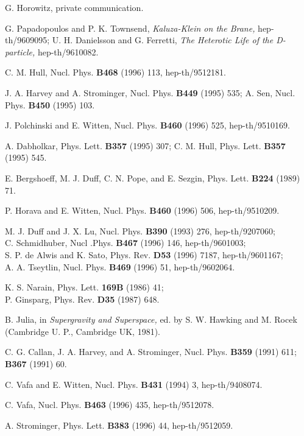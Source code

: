 \documentclass[12pt]{article}
\begin{document}
\begin{thebibliography}{99}
G. Horowitz, private communication.

G. Papadopoulos and P. K. Townsend, {\it Kaluza-Klein on the
Brane,} hep-th/9609095;\hfil\break
U. H. Danielsson and G. Ferretti, {\it The Heterotic Life of the D-particle,}
hep-th/9610082.

C. M. Hull, Nucl. Phys. {\bf B468} (1996) 113, hep-th/9512181.

J. A. Harvey and A. Strominger, Nucl. Phys. {\bf B449} (1995) 535;\hfil\break
A. Sen, Nucl. Phys. {\bf B450} (1995) 103.
 
J. Polchinski and E. Witten, Nucl. Phys. {\bf B460} (1996) 525, hep-th/9510169.

A. Dabholkar,  Phys. Lett. {\bf B357} (1995) 307;\hfil\break 
C. M. Hull, Phys. Lett. {\bf B357} (1995) 545.

E. Bergshoeff, M. J. Duff, C. N. Pope, and E.
Sezgin, Phys. Lett. {\bf B224} (1989) 71.

P. Horava and E. Witten, Nucl. Phys. {\bf B460} (1996) 506, hep-th/9510209.

M. J. Duff and J. X. Lu, Nucl. Phys. {\bf B390} (1993) 276, hep-th/9207060;\\
C. Schmidhuber, Nucl .Phys. {\bf B467} (1996) 146, hep-th/9601003;\\
S. P. de Alwis and K. Sato, Phys. Rev. {\bf D53} (1996) 7187,
hep-th/9601167;\\
A. A. Tseytlin, Nucl. Phys. {\bf B469} (1996) 51, hep-th/9602064.

K. S. Narain, Phys. Lett. {\bf 169B} (1986) 41;\\
P. Ginsparg, Phys. Rev. {\bf D35} (1987) 648. 

B. Julia, in {\it Supergravity and Superspace,} ed. by S. W. Hawking and M.
Rocek (Cambridge U. P., Cambridge UK, 1981).

C. G. Callan, J. A. Harvey, and A. Strominger, Nucl. Phys. {\bf
B359} (1991) 611; {\bf B367} (1991) 60.

C. Vafa and E. Witten, Nucl. Phys. {\bf B431} (1994) 3,
hep-th/9408074.

C. Vafa, Nucl. Phys. {\bf B463} (1996) 435, hep-th/9512078.

A. Strominger, Phys. Lett. {\bf B383} (1996) 44, hep-th/9512059. 


\end{thebibliography}
\end{document}
